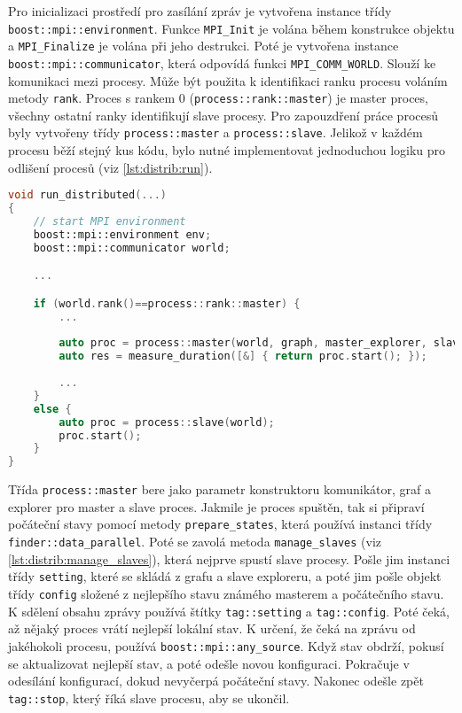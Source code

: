 Pro inicializaci prostředí pro zasílání zpráv je vytvořena instance třídy \texttt{boost::mpi::environment}.
Funkce \texttt{MPI\_Init} je volána během konstrukce objektu a \texttt{MPI\_Finalize} je volána při jeho destrukci.
Poté je vytvořena instance \texttt{boost::mpi::communicator}, která odpovídá funkci \texttt{MPI\_COMM\_WORLD}.
Slouží ke komunikaci mezi procesy.
Může být použita k identifikaci ranku procesu voláním metody \texttt{rank}.
Proces s rankem 0 (\texttt{process::rank::master}) je master proces, všechny ostatní ranky identifikují slave procesy.
Pro zapouzdření práce procesů byly vytvořeny třídy \texttt{process::master} a \texttt{process::slave}.
Jelikož v každém procesu běží stejný kus kódu, bylo nutné implementovat jednoduchou logiku pro odlišení procesů (viz \ref{lst:distrib:run}).

\begin{lstlisting}[language=C++, label={lst:distrib:run}, title={Rozdělení procesů}]
void run_distributed(...)
{
    // start MPI environment
    boost::mpi::environment env;
    boost::mpi::communicator world;

    ...

    if (world.rank()==process::rank::master) {
        ...
        
        auto proc = process::master(world, graph, master_explorer, slave_explorer);
        auto res = measure_duration([&] { return proc.start(); });
        
        ...
    }
    else {
        auto proc = process::slave(world);
        proc.start();
    }
}
\end{lstlisting}

Třída \texttt{process::master} bere jako parametr konstruktoru komunikátor, graf a explorer pro master a slave proces.
Jakmile je proces spuštěn, tak si připraví počáteční stavy pomocí metody \texttt{prepare\_states}, která používá instanci třídy \texttt{finder::data\_parallel}.
Poté se zavolá metoda \texttt{manage\_slaves} (viz \ref{lst:distrib:manage_slaves}), která nejprve spustí slave procesy.
Pošle jim instanci třídy \texttt{setting}, které se skládá z grafu a slave exploreru, a poté jim pošle objekt třídy \texttt{config} složené z nejlepšího stavu známého masterem a počátečního stavu.
K sdělení obsahu zprávy používá štítky \texttt{tag::setting} a \texttt{tag::config}.
Poté čeká, až nějaký proces vrátí nejlepší lokální stav.
K určení, že čeká na zprávu od jakéhokoli procesu, používá \texttt{boost::mpi::any\_source}.
Když stav obdrží, pokusí se aktualizovat nejlepší stav, a poté odešle novou konfiguraci.
Pokračuje v odesílání konfigurací, dokud nevyčerpá počáteční stavy.
Nakonec odešle zpět \texttt{tag::stop}, který říká slave procesu, aby se ukončil.

